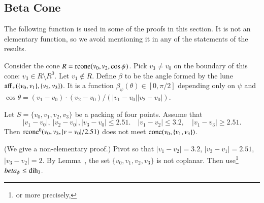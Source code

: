 \begin{tarskidata}
\section{Beta Cone}
The following function is used in some of the proofs in this
section.  It is not an elementary function, so we avoid mentioning
it in any of the statements of the results.  
\begin{tarski}

\begin{definition}[$\beta$]
Consider the cone $R={\operatorname{rcone}}(v_0,v_2,\cos\psi)$.  Pick
$v_3\ne v_0$ on the boundary of this cone: $v_3\in R\setminus R^0$.
Let $v_1\not\in R$.  
Define $\beta$ to be the angle formed by the lune
   ${\operatorname{aff}}_+(\{v_0,v_1\},\{v_2,v_3\})$. It is a function
$\beta_\psi(\theta)\in[0,\pi/2]$ depending only on $\psi$ and
$\cos\theta = (v_1-v_0)\cdot (v_2-v_0)/(|v_1-v_0||v_2-v_0|)$.
\end{definition}
\end{tarski}





\begin{tarski}

\begin{lemma}
 Let $S=\{v_0,v_1,v_2,v_3\}$ be a packing of four points.
Assume
that 
  $$
    |v_1-v_0|,\ |v_2-v_0|, |v_3-v_0|\le 2.51.\quad 
    |v_1-v_2|\le 3.2,\quad |v_1-v_3|\ge 2.51.
   $$
Then ${\operatorname{rcone}}^0(v_0,v_3,|v-v_0|/2.51)$ does not meet
${\operatorname{cone}}(v_0,\{v_1,v_3\})$.
\end{lemma}


\begin{proved} (We give a non-elementary proof.)
Pivot so that $|v_1-v_2|=3.2$, $|v_3-v_1|=2.51$, $|v_3-v_2|=2$. 
By Lemma~, the
set $\{v_0,v_1,v_2,v_3\}$ is not coplanar. 
Then use\footnote{ or more precisely,  } %
 $beta_\psi\le \operatorname{dih}_3$.
\swallowed\end{proved}
\end{tarski}






\end{tarskidata}
